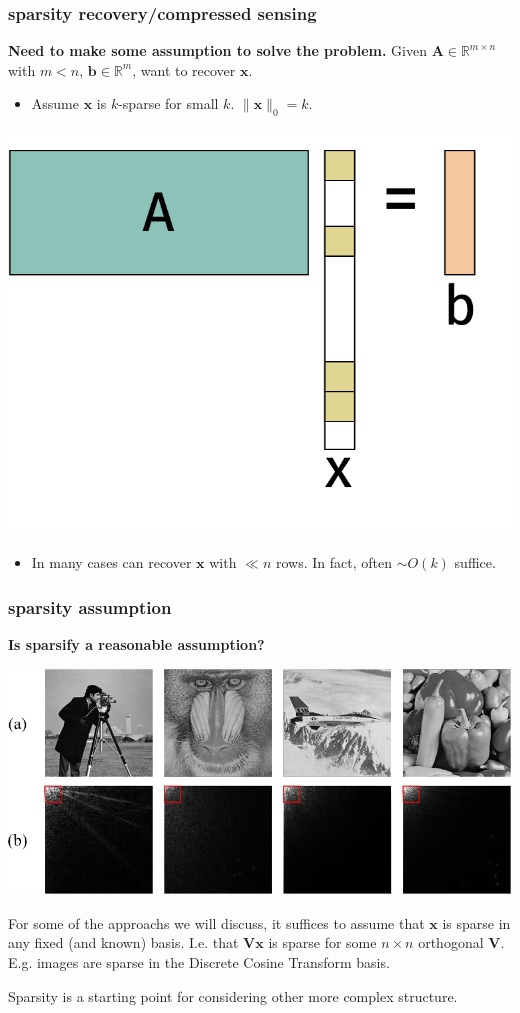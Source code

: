 \documentclass[compress]{beamer}
\newcommand{\bv}[1]{\mathbf{#1}}
\newcommand{\R}{\mathbb{R}}
\begin{document}
\begin{frame}
	\frametitle{sparsity recovery/compressed sensing}
	\textbf{Need to make some assumption to solve the problem.}
	Given $\bv{A}\in\R^{m \times n}$ with $m < n$, $\bv{b} \in \R^m$, want to recover  $\bv{x}$.
	\begin{itemize}
		\item \alert{Assume $\bv{x}$ is $k$-sparse for small $k$. $\|\bv{x}\|_0 = k$.}
	\end{itemize}
	\vspace{-1em}
	\begin{center}
		\includegraphics[width=.5\textwidth]{sparseRegressioon.png}
	\end{center}
	\vspace{-2em}
	\begin{itemize}
		\item In many cases can recover $\bv{x}$ with $\ll n$ rows. In fact, often $\sim O(k)$ suffice.
	\end{itemize}
\end{frame}

\begin{frame}
 \frametitle{sparsity assumption}
	\begin{center}
		\textbf{Is sparsify a reasonable assumption?}

		\includegraphics[width=.7\textwidth]{dct_basis.png}
		\end{center}
		For some of the approachs we will discuss, it suffices to assume that $\bv{x}$ is sparse in any fixed (and known) basis. I.e. that $\bv{V}\bv{x}$ is sparse for some $n\times n$ orthogonal $\bv{V}$. E.g. images are sparse in the Discrete Cosine Transform basis.

		Sparsity is a starting point for considering other more complex structure.
\end{frame}
\end{document}
